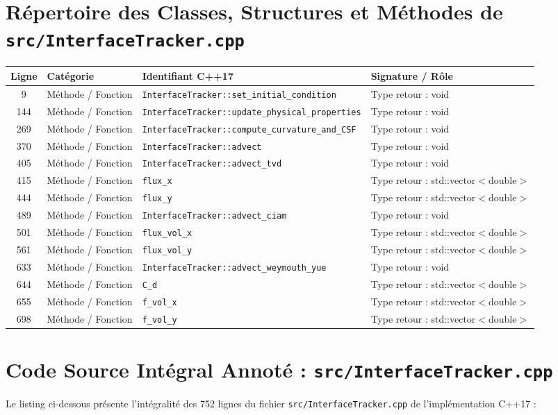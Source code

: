 \documentclass[10pt,a4paper,oneside]{book}
\begin{document}
\section{Répertoire des Classes, Structures et Méthodes de \texttt{src/InterfaceTracker.cpp}}
\begin{center}\small
\begin{tabular}{clll}
\toprule
\textbf{Ligne} & \textbf{Catégorie} & \textbf{Identifiant C++17} & \textbf{Signature / Rôle} \\
\midrule
9 & Méthode / Fonction & \texttt{InterfaceTracker::set\_initial\_condition} & Type retour : void \\
144 & Méthode / Fonction & \texttt{InterfaceTracker::update\_physical\_properties} & Type retour : void \\
269 & Méthode / Fonction & \texttt{InterfaceTracker::compute\_curvature\_and\_CSF} & Type retour : void \\
370 & Méthode / Fonction & \texttt{InterfaceTracker::advect} & Type retour : void \\
405 & Méthode / Fonction & \texttt{InterfaceTracker::advect\_tvd} & Type retour : void \\
415 & Méthode / Fonction & \texttt{flux\_x} & Type retour : std::vector$<$double$>$ \\
444 & Méthode / Fonction & \texttt{flux\_y} & Type retour : std::vector$<$double$>$ \\
489 & Méthode / Fonction & \texttt{InterfaceTracker::advect\_ciam} & Type retour : void \\
501 & Méthode / Fonction & \texttt{flux\_vol\_x} & Type retour : std::vector$<$double$>$ \\
561 & Méthode / Fonction & \texttt{flux\_vol\_y} & Type retour : std::vector$<$double$>$ \\
633 & Méthode / Fonction & \texttt{InterfaceTracker::advect\_weymouth\_yue} & Type retour : void \\
644 & Méthode / Fonction & \texttt{C\_d} & Type retour : std::vector$<$double$>$ \\
655 & Méthode / Fonction & \texttt{f\_vol\_x} & Type retour : std::vector$<$double$>$ \\
698 & Méthode / Fonction & \texttt{f\_vol\_y} & Type retour : std::vector$<$double$>$ \\
\bottomrule
\end{tabular}
\end{center}

\section{Code Source Intégral Annoté : \texttt{src/InterfaceTracker.cpp}}
Le listing ci-dessous présente l'intégralité des 752 lignes du fichier \texttt{src/InterfaceTracker.cpp} de l'implémentation C++17 :
\end{document}

